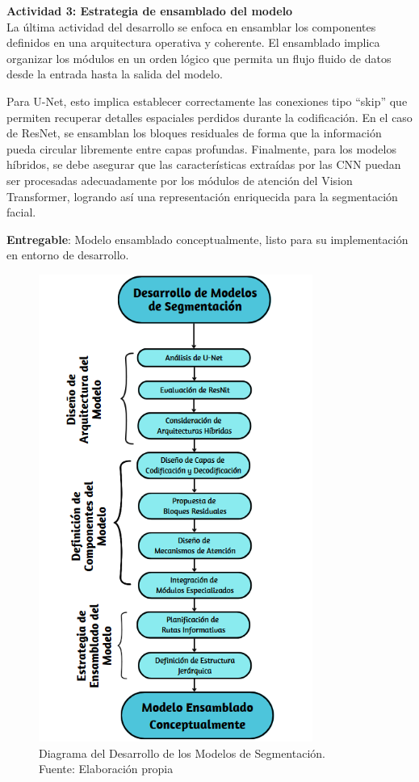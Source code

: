  \textbf{Actividad 3: Estrategia de ensamblado del modelo}
 \\
 La última actividad del desarrollo se enfoca en ensamblar los componentes definidos en una arquitectura operativa y coherente. El ensamblado implica organizar los módulos en un orden lógico que permita un flujo fluido de datos desde la entrada hasta la salida del modelo.

Para U-Net, esto implica establecer correctamente las conexiones tipo “skip” que permiten recuperar detalles espaciales perdidos durante la codificación. En el caso de ResNet, se ensamblan los bloques residuales de forma que la información pueda circular libremente entre capas profundas. Finalmente, para los modelos híbridos, se debe asegurar que las características extraídas por las CNN puedan ser procesadas adecuadamente por los módulos de atención del Vision Transformer, logrando así una representación enriquecida para la segmentación facial.

 \textbf{Entregable}: Modelo ensamblado conceptualmente, listo para su implementación en entorno de desarrollo.

 
 \begin{figure}[h]
    \begin{center}
        \includegraphics[width=0.8\textwidth]{3/figures/Diagrama de Desarrollo.png}
        \caption[Diagrama del Desarrollo de los Modelos de Segmentación]{Diagrama del Desarrollo de los Modelos de Segmentación.\\
        Fuente: Elaboración propia}
        \label{3:fig5}
    \end{center}
\end{figure}

